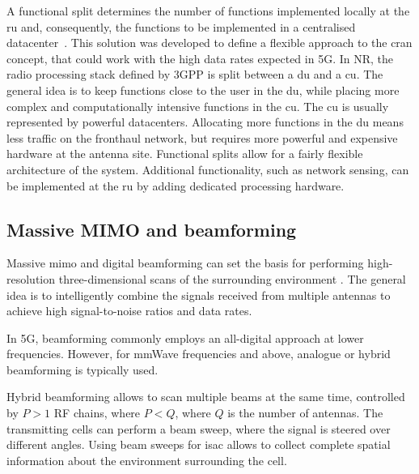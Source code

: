 	A functional split determines the number of functions implemented locally at the \gls{ru} and, consequently, the functions to be implemented in a centralised datacenter~\cite{Larsen_Checko_Christiansen_2019}. 
 	This solution was developed to define a flexible approach to the \gls{cran} concept, that could work with the high data rates expected in 5G. 
	In \gls{NR}, the radio processing stack defined by \gls{3GPP} is split between a \gls{du} and a \gls{cu}. 
	The general idea is to keep functions close to the user in the \gls{du}, while placing more complex and computationally intensive functions in the \gls{cu}. The \gls{cu} is usually represented by powerful datacenters.
	Allocating more functions in the \gls{du} means less traffic on the fronthaul network, but requires more powerful and expensive hardware at the antenna site.
	Functional splits allow for a fairly flexible architecture of the system. Additional functionality, such as network sensing, can be implemented at the \gls{ru} by adding dedicated processing hardware.

	 
	
	\subsection{Massive MIMO and beamforming}
	
	Massive \gls{mimo} and digital beamforming can set the basis for performing high-resolution three-dimensional scans of the surrounding environment \cite{MIMO-next-gen}.
	The general idea is to intelligently combine the signals received from multiple antennas to achieve high signal-to-noise ratios and data rates.
	
	In \gls{5G}, beamforming commonly employs an all-digital approach at lower frequencies. However, for mmWave frequencies and above, analogue or hybrid beamforming is typically used. 
	
	Hybrid beamforming allows to scan multiple beams at the same time, controlled by $P >1$ RF chains, where $P < Q$, where $Q$ is the number of antennas. 
	The transmitting cells can perform a beam sweep, where the signal is steered over different angles. 
	Using beam sweeps for \gls{isac} allows to collect complete spatial information about the environment surrounding the cell.
	
